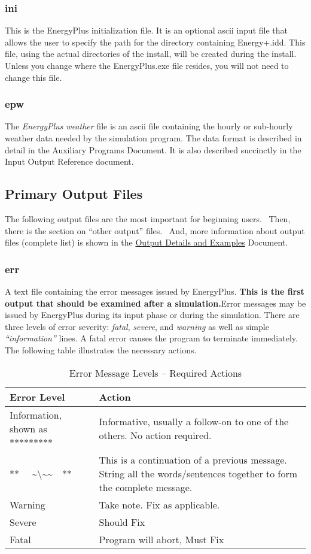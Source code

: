 \subsubsection{ini}\label{ini}

This is the EnergyPlus initialization file. It is an optional ascii input file that allows the user to specify the path for the directory containing Energy+.idd. This file, using the actual directories of the install, will be created during the install. Unless you change where the EnergyPlus.exe file resides, you will not need to change this file.

\subsubsection{epw}\label{epw}

The \emph{EnergyPlus weather} file is an ascii file containing the hourly or sub-hourly weather data needed by the simulation program. The data format is described in detail in the Auxiliary Programs Document. It is also described succinctly in the Input Output Reference document.

\subsection{Primary Output Files}\label{primary-output-files}

The following output files are the most important for beginning users.~ Then, there is the section on ``other output'' files.~ And, more information about output files (complete list) is shown in the \href{file:///E:/Docs4PDFs/OutputDetailsAndExamples.pdf}{Output Details and Examples} Document.

\subsubsection{err}\label{err}

A text file containing the error messages issued by EnergyPlus. \textbf{This is the first output that should be examined after a simulation.}Error messages may be issued by EnergyPlus during its input phase or during the simulation. There are three levels of error severity: \emph{fatal}, \emph{severe}, and \emph{warning} as well as simple \emph{``information''} lines. A fatal error causes the program to terminate immediately. The following table illustrates the necessary actions.

\begin{longtable}[c]{p{1.5in}p{4.5in}}
\caption{Error Message Levels – Required Actions \protect \label{table:error-message-levels-required-actions}}\\
\toprule 
Error Level & Action \tabularnewline \midrule
\endhead
Information, shown as ********* & Informative, usually a follow-on to one of the others. No action required. \tabularnewline
**~~ \~{}\textbackslash\~{}\~{}~~** & This is a continuation of a previous message.~ String all the words/sentences together to form the complete message. \tabularnewline
Warning & Take note. Fix as applicable. \tabularnewline
Severe & Should Fix \tabularnewline
Fatal & Program will abort, Must Fix \tabularnewline
\bottomrule
\end{longtable}

